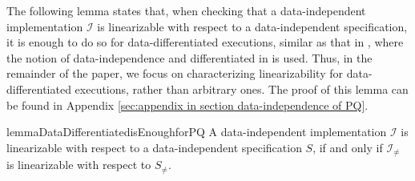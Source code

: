 The following lemma states that, when checking that a data-independent implementation $\mathcal{I}$ is linearizable with respect to a data-independent specification, it is enough to do so for data-differentiated executions, similar as that in \cite{Abdulla:2013}, where the notion of data-independence and differentiated in \cite{Wolper:1986} is used. Thus, in the remainder of the paper, we focus on characterizing linearizability for data-differentiated executions, rather than arbitrary ones. The proof of this lemma can be found in Appendix \ref{sec:appendix in section data-independence of PQ}.

\begin{restatable}{lemma}{DataDifferentiatedisEnoughforPQ}
\label{lemma:data differentiated is enough for PQ}
A data-independent implementation $\mathcal{I}$ is linearizable with respect to a data-independent specification $S$, if and only if $\mathcal{I}_{\neq}$ is linearizable with respect to $S_{\neq}$.
\end{restatable}
